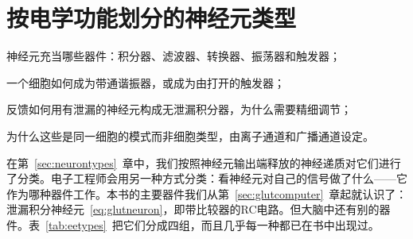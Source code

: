 \chapter{按电学功能划分的神经元类型}
\label{sec:eetypes}
\begin{chaptergoals}
\item 神经元充当哪些器件：积分器、滤波器、转换器、振荡器和触发器；
\item 一个细胞如何成为带通谐振器，或成为由打开的触发器；
\item 反馈如何用有泄漏的神经元构成无泄漏积分器，为什么需要精细调节；
\item 为什么这些是同一细胞的模式而非细胞类型，由离子通道和广播通道设定。
\end{chaptergoals}

在第~\ref{sec:neurontypes}~章中，我们按照神经元输出端释放的神经递质对它们进行了分类。电子工程师会用另一种方式分类：看神经元对自己的信号做了什么——它作为哪种器件工作。本书的主要器件我们从第~\ref{sec:glutcomputer}~章起就认识了：泄漏积分神经元~\eqref{eq:glutneuron}，即带比较器的RC电路。但大脑中还有别的器件。表~\ref{tab:eetypes}~把它们分成四组，而且几乎每一种都已在书中出现过。

